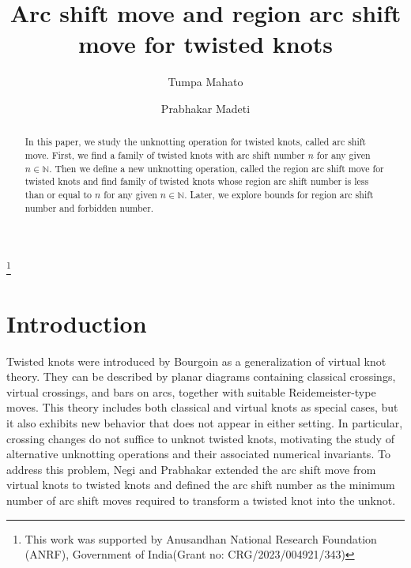 \documentclass[10pt,a4paper,reqno]{amsart}
\theoremstyle{definition}
\theoremstyle{remark}
\begin{document}
	
	
		\title[Arc shift move and region arc shift move for twisted knots]{Arc shift move and region arc shift move for twisted knots}
	
	
	\author[T. MAHATO]{Tumpa Mahato}
	\address{Department of Mathematics,\\ Indian Institute of Technology, Ropar, Punjab 140001, India}
	
	\author[P. MADETI]{Prabhakar Madeti}
	\address{Department of Mathematics,\\ Indian Institute of Technology, Ropar, Punjab 140001, India}
	

	\makeatletter
	\makeatother
	
	\thanks{This work was supported by  Anusandhan National Research Foundation (ANRF), Government of India(Grant no: CRG/2023/004921/343)}

	



	\begin{abstract}
		In this paper, we study the unknotting operation for twisted knots, called arc shift move. First, we find a family of twisted knots with arc shift number $n$ for any given $n \in \mathbb{N}$. Then we define a new unknotting operation, called the region arc shift move for twisted knots and find  family of twisted knots  whose region arc shift number is less than or equal to $n$ for any given $n \in \mathbb{N}$. Later, we explore bounds for region arc shift number and forbidden number.
	\end{abstract}

	\maketitle
	\section{Introduction}\label{sec:intro}
	
	Twisted knots were introduced by Bourgoin\cite{Bur} as a generalization of virtual knot theory. They can be described by planar diagrams containing classical crossings, virtual crossings, and bars on arcs, together with suitable Reidemeister-type moves. This theory includes both classical and virtual knots as special cases, but it also exhibits new behavior that does not appear in either setting.
	In particular, crossing changes do not suffice to unknot twisted knots, motivating the study of alternative unknotting operations and their associated numerical invariants. To address this problem, Negi and Prabhakar \cite{Negi} extended the arc shift move from virtual knots to twisted knots and defined the arc shift number as the minimum number of arc shift moves required to transform a twisted knot into the unknot.
	
\end{document}
